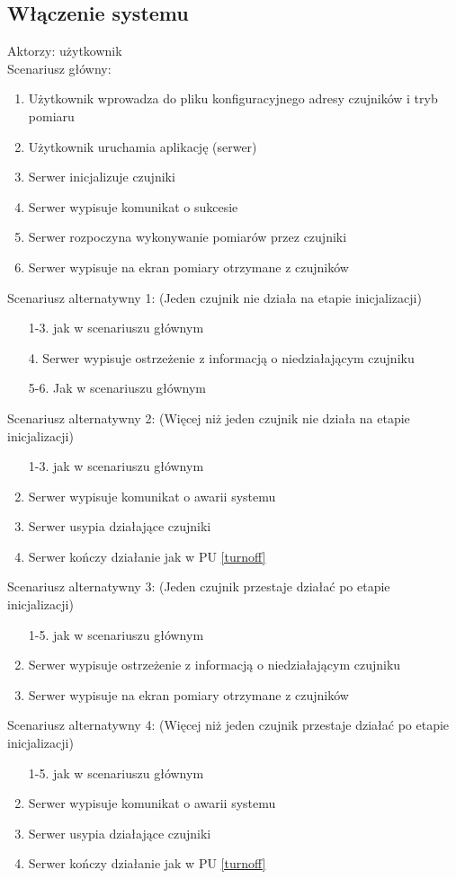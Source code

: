 \documentclass[a4paper,11pt]{article}
\begin{document}
\subsection{Włączenie systemu}
Aktorzy: użytkownik\\
Scenariusz główny:
\begin{enumerate}
   \item Użytkownik wprowadza do pliku konfiguracyjnego adresy czujników i tryb pomiaru    
   \item Użytkownik uruchamia aplikację (serwer)
   \item Serwer inicjalizuje czujniki
   \item Serwer wypisuje komunikat o sukcesie
   \item Serwer rozpoczyna wykonywanie pomiarów przez czujniki
   \item Serwer wypisuje na ekran pomiary otrzymane z czujników
\end{enumerate}
Scenariusz alternatywny 1: (Jeden czujnik nie działa na etapie inicjalizacji)
\begin{enumerate}
   \item [1-3.] jak w scenariuszu głównym
   \item [4.] Serwer wypisuje ostrzeżenie z informacją o niedziałającym czujniku
   \item [5-6.] Jak w scenariuszu głównym
\end{enumerate}
Scenariusz alternatywny 2: (Więcej niż jeden czujnik nie działa na etapie inicjalizacji)
\begin{enumerate}
   \item [1-3.] jak w scenariuszu głównym
   \setcounter{enumi}{3}
   \item Serwer wypisuje komunikat o awarii systemu
   \item Serwer usypia działające czujniki
   \item Serwer kończy działanie jak w PU \ref{turnoff}
\end{enumerate}
Scenariusz alternatywny 3: (Jeden czujnik przestaje działać po etapie inicjalizacji)
\begin{enumerate}
   \item [1-5.] jak w scenariuszu głównym
   \setcounter{enumi}{5}
   \item Serwer wypisuje ostrzeżenie z informacją o niedziałającym czujniku
   \item Serwer wypisuje na ekran pomiary otrzymane z czujników
\end{enumerate}
Scenariusz alternatywny 4: (Więcej niż jeden czujnik przestaje działać po etapie inicjalizacji)
\begin{enumerate}
   \item [1-5.] jak w scenariuszu głównym
   \setcounter{enumi}{5}
   \item Serwer wypisuje komunikat o awarii systemu
   \item Serwer usypia działające czujniki
   \item Serwer kończy działanie jak w PU \ref{turnoff}
\end{enumerate}
\end{document}
